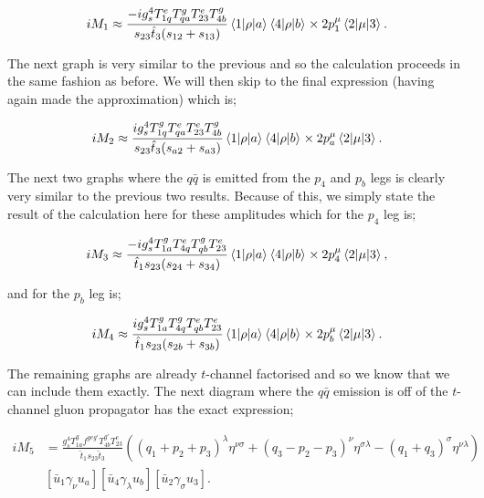 \begin{equation}
iM_1 \approx  \frac{- i g_s^4 T^e_{1q}T^g_{qa}T^e_{23}T^g_{4b}}{s_{23} \hat{t}_3 (s_{12} + s_{13})} \mathinner{\langle1\vert\rho\vert a\rangle}_{} \mathinner{\langle4\vert\rho\vert b\rangle}_{} \times 2p_1^\mu \mathinner{\langle2\vert\mu\vert3\rangle}_{}.
\end{equation} 

The next graph is very similar to the previous and so the calculation proceeds in the same fashion as before. We will then skip to the final expression (having again made the approximation) which is;

\begin{equation}
iM_2 \approx \frac{ i g_s^4 T^g_{1q}T^e_{qa}T^e_{23}T^g_{4b}}{s_{23} \hat{t}_3 (s_{a2}+s_{a3})} \mathinner{\langle1\vert\rho\vert a\rangle}_{} \mathinner{\langle4\vert\rho\vert b\rangle}_{}\times 2p_a^\mu \mathinner{\langle2\vert\mu\vert3\rangle}_{}.
\end{equation}    

The next two graphs where the $q \bar{q}$ is emitted from the $p_4$ and $p_b$ legs is clearly very similar to the previous two results. Because of this, we simply state the result of the calculation here for these amplitudes which for the $p_4$ leg is;

\begin{equation}
iM_3 \approx \frac{-i g_s^4 T^g_{1a} T^e_{4q}T^g_{qb}T^e_{23}}{\hat{t}_1 s_{23}(s_{24}+s_{34})}\mathinner{\langle1\vert\rho\vert a\rangle}_{} \mathinner{\langle4\vert\rho\vert b\rangle}_{} \times 2 p_4^\mu \mathinner{\langle2\vert\mu\vert3\rangle}_{},
\end{equation}

and for the $p_b$ leg is;

\begin{equation}
iM_4 \approx \frac{i g_s^4 T^g_{1a} T^g_{4q} T^e_{qb} T^e_{23}}{\hat{t}_1 s_{23}(s_{2b}+s_{3b})} \mathinner{\langle1\vert\rho\vert a\rangle}_{} \mathinner{\langle4\vert\rho\vert b\rangle}_{} \times 2 p_b^\mu \mathinner{\langle2\vert\mu\vert3\rangle}_{}.
\end{equation}

The remaining graphs are already $t$-channel factorised and so we know that we can include them exactly. The next diagram where the $q \bar{q}$ emission is off of the $t$-channel gluon propagator has the exact expression;

\begin{equation}
\begin{split}
iM_5 &= \frac{g_s^4 T^g_{1a} f^{geg'}T^{g'}_{4b}T^e_{23}}{\hat{t}_1 s_{23} \hat{t}_3} \left((q_1 + p_2 + p_3)^\lambda \eta^{\nu \sigma} + (q_3 - p_2 -p_3)^\nu \eta^{\sigma \lambda} - (q_1 + q_3)^\sigma \eta^{\nu \lambda} \right) \\
& \left[\bar{u}_1 \gamma_\nu u_a \right]  \left[\bar{u}_4 \gamma_\lambda u_b \right] \left[\bar{u}_2 \gamma_\sigma u_3 \right].
\end{split}
\end{equation}

